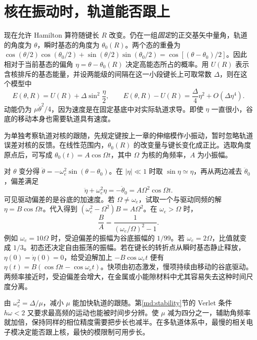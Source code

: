 \section{核在振动时，轨道能否跟上}
现在允许 Hamilton 算符随键长 $R$ 改变。仍在一组\emph{固定}的正交基矢中量角，轨道的角度为 $\theta$，瞬时基态的角度为 $\theta_0(R)$。两个态的重叠为 $\cos(\theta/2)\cos(\theta_0/2)+\sin(\theta/2)\sin(\theta_0/2)=\cos[(\theta-\theta_0)/2]$。因此相对于当前基态的偏角 $\eta=\theta-\theta_0(R)$ 决定高能态所占的概率。用 $U(R)$ 表示含核排斥的基态能量，并设两能级的间隔在这一小段键长上可取常数 $\Delta$，则在这个模型中
\begin{equation}\label{cp:moving-energy}
 E(\theta,R)=U(R)+\Delta\sin^2\!\frac{\eta}{2},\qquad
 E(\theta,R)-U(R)=\frac{\Delta}{4}\eta^2+O(\Delta\eta^4).
\end{equation}
动能仍为 $\mu\dot\theta^2/4$，因为速度是在固定基底中对实际轨道求导。即使 $\eta$ 一直很小，谷底的移动本身也需要轨道具有速度。

为单独考察轨道对核的跟随，先规定键按上一章的伸缩模作小振动，暂时忽略轨道误差对核的反馈。在线性范围内，$\theta_0(R)$ 的改变量与键长变化成正比。选取角度原点后，可写成 $\theta_0(t)=A\cos\Omega t$，其中 $\Omega$ 为核的角频率，$A$ 为小振幅。

对 $\theta$ 变分得 $\ddot\theta=-\omega_e^2\sin(\theta-\theta_0)$。在 $|\eta|\ll1$ 时取 $\sin\eta\simeq\eta$，再从两边减去 $\ddot\theta_0$，偏差满足
\begin{equation}\label{cp:tracking}
 \ddot\eta+\omega_e^2\eta=-\ddot\theta_0=A\Omega^2\cos\Omega t .
\end{equation}
可见驱动偏差的是谷底的加速度。若 $\Omega\ne\omega_e$，试取一个与驱动同频的解 $\eta=B\cos\Omega t$。代入得到 $(\omega_e^2-\Omega^2)B=A\Omega^2$。在 $\omega_e>\Omega$ 时，
\[
 \frac{B}{A}=\frac{1}{(\omega_e/\Omega)^2-1}.
\]
例如 $\omega_e=10\Omega$ 时，受迫偏差的振幅为谷底振幅的 $1/99$。若 $\omega_e=2\Omega$，比值就变成 $1/3$。初态还决定自由振荡的振幅。若在键长的转折点从瞬时基态静止释放，$\eta(0)=\dot\eta(0)=0$，给受迫解加上 $-B\cos\omega_e t$ 便有 $\eta(t)=B(\cos\Omega t-\cos\omega_e t)$。快项由初态激发，慢项持续由移动的谷底驱动。两频率接近时，受迫偏差会增大，在金属或小能隙材料中尤其容易失去这种时间尺度分离。

由 $\omega_e^2=\Delta/\mu$，减小 $\mu$ 能加快轨道的跟随。第\ref{md:stability}节的 Verlet 条件 $h\omega<2$ 又要求最高频的运动也能被时间步分辨。使 $\mu$ 减为四分之一，辅助角频率就加倍，保持同样的相位精度需要把步长也减半。在多轨道体系中，最慢的相关电子模决定能否跟上核，最快的模限制可用步长。

